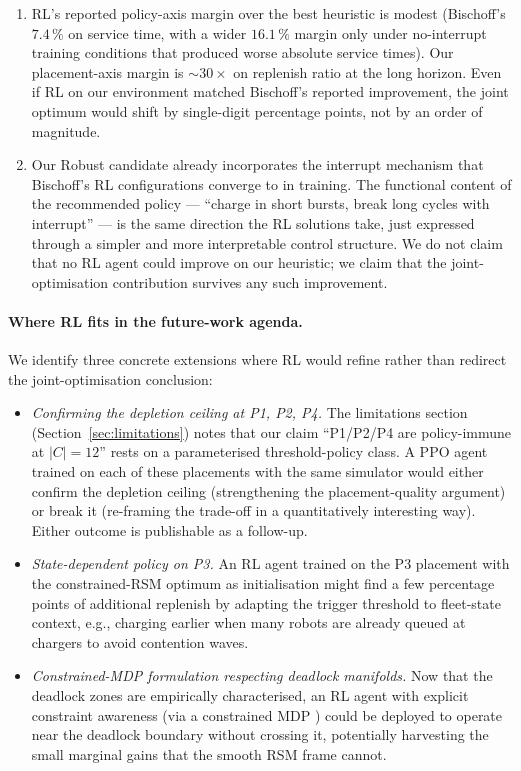 \documentclass[conference]{IEEEtran}
\begin{document}
\begin{enumerate}
  \item RL's reported policy-axis margin over the best heuristic is modest (Bischoff's $7.4\,\%$ on service time, with a wider $16.1\,\%$ margin only under no-interrupt training conditions that produced worse absolute service times). Our placement-axis margin is $\sim\!30\times$ on replenish ratio at the long horizon. Even if RL on our environment matched Bischoff's reported improvement, the joint optimum would shift by single-digit percentage points, not by an order of magnitude.
  \item Our Robust candidate already incorporates the interrupt mechanism that Bischoff's RL configurations converge to in training. The functional content of the recommended policy --- ``charge in short bursts, break long cycles with interrupt'' --- is the same direction the RL solutions take, just expressed through a simpler and more interpretable control structure. We do not claim that no RL agent could improve on our heuristic; we claim that the joint-optimisation contribution survives any such improvement.
\end{enumerate}

\paragraph{Where RL fits in the future-work agenda.}
We identify three concrete extensions where RL would refine rather than redirect the joint-optimisation conclusion:
\begin{itemize}
  \item \emph{Confirming the depletion ceiling at P1, P2, P4.} The limitations section (Section~\ref{sec:limitations}) notes that our claim ``P1/P2/P4 are policy-immune at $|C|=12$'' rests on a parameterised threshold-policy class. A PPO agent trained on each of these placements with the same simulator would either confirm the depletion ceiling (strengthening the placement-quality argument) or break it (re-framing the trade-off in a quantitatively interesting way). Either outcome is publishable as a follow-up.
  \item \emph{State-dependent policy on P3.} An RL agent trained on the P3 placement with the constrained-RSM optimum as initialisation might find a few percentage points of additional replenish by adapting the trigger threshold to fleet-state context, e.g., charging earlier when many robots are already queued at chargers to avoid contention waves.
  \item \emph{Constrained-MDP formulation respecting deadlock manifolds.} Now that the deadlock zones are empirically characterised, an RL agent with explicit constraint awareness (via a constrained MDP \cite{bischoff2025}) could be deployed to operate near the deadlock boundary without crossing it, potentially harvesting the small marginal gains that the smooth RSM frame cannot.
\end{itemize}
\end{document}
